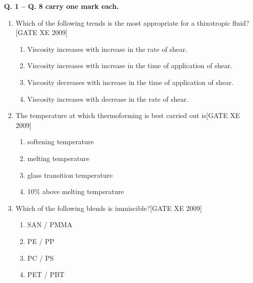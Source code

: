 \documentclass[journal,12pt,onecolumn]{IEEEtran}
\theoremstyle{remark}
\begin{document}
\begin{enumerate}
\begin{enumerate}
\textbf{Q. 1 -- Q. 8 carry one mark each.}

\vspace{0.5em}

\begin{enumerate}[label=\textbf{Q.\arabic*.},  wide=0pt, leftmargin=*]

    \item Which of the following trends is the most appropriate for a thixotropic fluid?\hfill[GATE XE 2009]
    \begin{multicols}{2}
    \begin{enumerate}
        \item Viscosity increases with increase in the rate of shear. 
        \item Viscosity increases with increase in the time of application of shear. 
        \item Viscosity decreases with increase in the time of application of shear. 
        \item Viscosity increases with decrease in the rate of shear.
    \end{enumerate}
    \end{multicols}

   \item The temperature at which thermoforming is best carried out is\hfill[GATE XE 2009]
   \begin{multicols}{2}
    \begin{enumerate}
        \item softening temperature 
        \item melting temperature 
        \item glass transition temperature 
        \item 10\% above melting temperature
    \end{enumerate}
    \end{multicols}

    \item  Which of the following blends is immiscible?\hfill[GATE XE 2009]
    \begin{multicols}{2}
    \begin{enumerate}
        \item SAN / PMMA 
        \item PE / PP 
        \item PC / PS 
        \item PET / PBT
    \end{enumerate}
    \end{multicols}


\end{enumerate}
\end{enumerate}
\end{enumerate}
\end{document}
